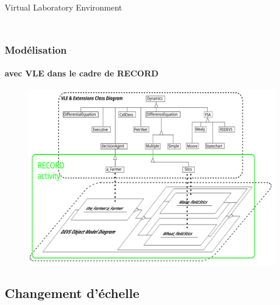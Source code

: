 \documentclass[xetex, compress, table, svgnames]{beamer}
\begin{document}
\begin{frame}
\begin{block}{Virtual Laboratory Environment}
\begin{columns}
\begin{column}{.47\textwidth}
\begin{figure}
        \end{figure}
      \end{column}
    \end{columns}
  \end{block}
\end{frame}

\begin{frame}
  \frametitle{Modélisation}
  \framesubtitle{avec VLE dans le cadre de RECORD}
  \begin{exampleblock}{}
    \begin{figure}[h]
      \centering
      \includegraphics[width=.9\textwidth]{fig/workingWithRECORDandVLE}
    \end{figure}
  \end{exampleblock}
\end{frame}

\subsection{Changement d'échelle}
\end{document}
